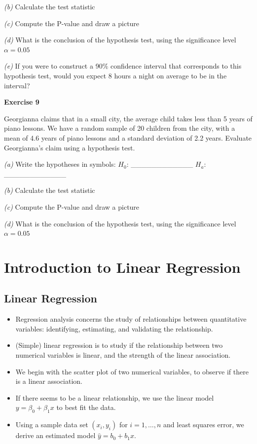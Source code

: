 \documentclass[
]{book}
\begin{document}
\emph{(b)} Calculate the test statistic

\emph{(c)} Compute the P-value and draw a picture

\emph{(d)} What is the conclusion of the hypothesis test, using the significance level \(\alpha=0.05\)

\emph{(e)} If you were to construct a 90\% confidence interval that corresponds to this hypothesis test, would you expect 8 hours a night on average to be in the interval?

\textbf{Exercise 9}

Georgianna claims that in a small city, the average child takes less than 5 years of piano lessons. We have a random sample of 20 children from the city, with a mean of 4.6 years of piano lessons and a standard deviation of 2.2 years. Evaluate Georgianna's claim using a hypothesis test.

\emph{(a)} Write the hypotheses in symbols: \(H_0\): \_\_\_\_\_\_\_\_\_\_\_\_ \(H_a\): \_\_\_\_\_\_\_\_\_\_\_\_

\emph{(b)} Calculate the test statistic

\emph{(c)} Compute the P-value and draw a picture

\emph{(d)} What is the conclusion of the hypothesis test, using the significance level \(\alpha=0.05\)

\chapter{Introduction to Linear Regression}\label{introduction-to-linear-regression}

\section{Linear Regression}\label{linear-regression}

\begin{itemize}
\item
  Regression analysis concerns the study of relationships between quantitative variables: identifying, estimating, and validating the relationship.
\item
  (Simple) linear regression is to study if the relationship between two numerical variables is linear, and the strength of the linear association.
\item
  We begin with the scatter plot of two numerical variables, to observe if there is a linear association.
\item
  If there seems to be a linear relationship, we use the linear model \(y = \beta_0 + \beta_1x\) to best fit the data.
\item
  Using a sample data set \((x_i, y_i)\) for \(i = 1, \ldots, n\) and least squares error, we derive an estimated model \(\hat{y} = b_0 + b_1x\).
\end{itemize}
\end{document}
